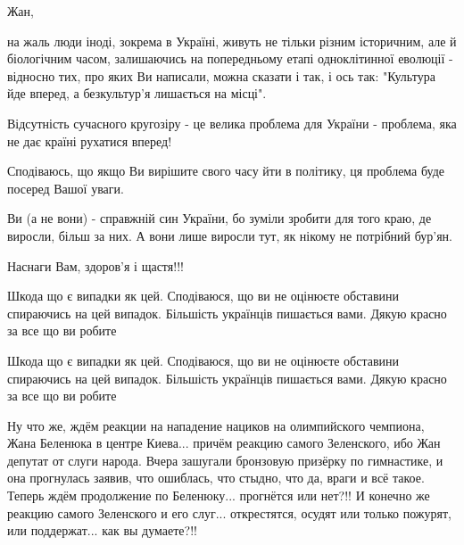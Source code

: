 \begin{itemize}
 

Жан,

на жаль люди іноді, зокрема в Україні, живуть не тільки різним історичним, але
й біологічним часом, залишаючись на попередньому етапі одноклітинної еволюції -
відносно тих, про яких Ви написали, можна сказати і так, і ось так: "Культура
йде вперед, а безкультур'я лишається на місці".

Відсутність сучасного кругозіру - це велика проблема для України - проблема,
яка не дає країні рухатися вперед!

Сподіваюсь, що якщо Ви вирішите свого часу йти в політику, ця проблема буде
посеред Вашої уваги.

Ви (а не вони) - справжній син України, бо зуміли зробити для того краю, де
виросли, більш за них. А вони лише виросли тут, як нікому не потрібний бур'ян.

Наснаги Вам, здоров'я і щастя!!!


 

Шкода що є випадки як цей. Сподіваюся, що ви не оцінюєте обставини спираючись
на цей випадок. Більшість українців пишається вами. Дякую красно за все що ви
робите

 

Шкода що є випадки як цей. Сподіваюся, що ви не оцінюєте обставини спираючись
на цей випадок. Більшість українців пишається вами. Дякую красно за все що ви
робите


 

Ну что же, ждём реакции на нападение нациков на олимпийского чемпиона, Жана
Беленюка в центре Киева... причём реакцию самого Зеленского, ибо Жан депутат от
слуги народа. Вчера зашугали бронзовую призёрку по гимнастике, и она прогнулась
заявив, что ошиблась, что стыдно, что да, враги и всё такое. Теперь ждём
продолжение по Беленюку... прогнётся или нет?!! И конечно же реакцию самого
Зеленского и его слуг... открестятся, осудят или только пожурят, или
поддержат... как вы думаете?!!



\end{itemize}
